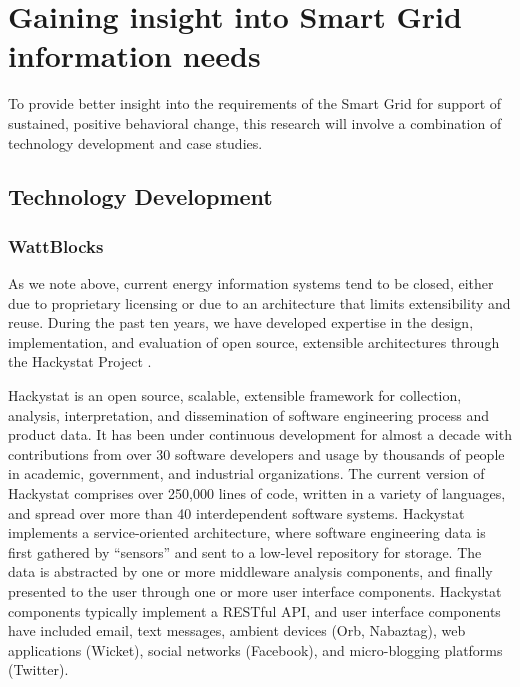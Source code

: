 \section{Gaining insight into Smart Grid information needs}
\label{sec:methodology}

To provide better insight into the requirements of the Smart Grid for
support of sustained, positive behavioral change, this research will
involve a combination of  technology development and case studies.

\subsection{Technology Development}

\subsubsection{WattBlocks}

As we note above, current energy information systems tend to be closed,
either due to proprietary licensing or due to an architecture that limits
extensibility and reuse.  During the past ten years, we have developed
expertise in the design, implementation, and evaluation of open source,
extensible architectures through the Hackystat Project
\cite{csdl2-06-06,csdl2-09-02,csdl2-09-07,csdl2-09-01}.

Hackystat is an open source, scalable, extensible framework for collection,
analysis, interpretation, and dissemination of software engineering process
and product data.  It has been under continuous development for almost a
decade with contributions from over 30 software developers and usage by
thousands of people in academic, government, and industrial
organizations. The current version of Hackystat comprises over 250,000
lines of code, written in a variety of languages, and spread over more than
40 interdependent software systems.  Hackystat implements a
service-oriented architecture, where software engineering data is first
gathered by ``sensors'' and sent to a low-level repository for storage.
The data is abstracted by one or more middleware analysis components, and
finally presented to the user through one or more user interface
components.  Hackystat components typically implement a RESTful API, and
user interface components have included email, text messages, ambient
devices (Orb, Nabaztag), web applications (Wicket), social networks
(Facebook), and micro-blogging platforms (Twitter).


